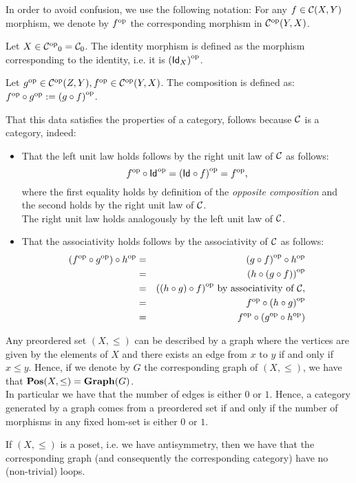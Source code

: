 \begin{solution}\label{sol:opposite}
  In order to avoid confusion, we use the following notation: For any $f\in\CHom{\CC}{X}{Y}$ morphism, we denote by $\op{f}$ the corresponding morphism in $\CHom{\op\CC}{Y}{X}$.
  
  Let $X\in \Ob{\op\CC} = \Ob{\CC}$. The identity morphism is defined as the morphism corresponding to the identity, i.e. it is $\op{(\Id[X])}$.
  
  Let $\op{g} \in \CHom{\op\CC}{Z}{Y}, \op{f}\in \CHom{\op\CC}{Y}{X}$. The composition is defined as: $\co{\op g}{\op f} := \op{(\co{f}{g})}$.
  
That this data satisfies the properties of a category, follows because $\CC$ is a category, indeed:
\begin{itemize}
\item That the left unit law holds follows by the right unit law of $\CC$ as follows:
\[
\co{\op{\Id}}{\op{f}} = \op{(\co{f}{\Id})} = \op{f},
\]
where the first equality holds by definition of the \textit{opposite composition} and the second holds by the right unit law of $\CC$.\\
The right unit law holds analogously by the left unit law of $\CC$.
\item That the associativity holds follows by the associativity of $\CC$ as follows:
\begin{eqnarray*}
\co{\op{h}}{(\co{\op g}{\op f})} &=& \co{\op{h}}{\op{(\co{f}{g})}}\\
 	&=& \op{(\co{(\co{f}{g})}{h})}\\ 
 	&=& \op{(\co{f}{(\co{g}{h})})} \text{ by associativity of $\CC$},\\
 	&=& \co{\op{(\co{g}{h})}}{\op f}\\
 	&=& \co{(\co{\op h}{\op g})}{\op f}
\end{eqnarray*}
\end{itemize}
\end{solution}

\begin{solution}\label{sol:connection_graphs_preordersets}
Any preordered set $(X,\leq)$ can be described by a graph where the vertices are given by the elements of $X$ and there exists an edge from $x$ to $y$ if and only if $x \leq y$. Hence, if we denote by $G$ the corresponding graph of $(X,\leq)$, we have that $\POS(X,\leq) = \mathbf{Graph}(G)$.\\
In particular we have that the number of edges is either $0$ or $1$. Hence, a category generated by a graph comes from a preordered set if and only if the number of morphisms in any fixed hom-set is either $0$ or $1$.

If $(X,\leq)$ is a poset, i.e. we have antisymmetry, then we have that the corresponding graph (and consequently the corresponding category) have no (non-trivial) loops.
\end{solution}


